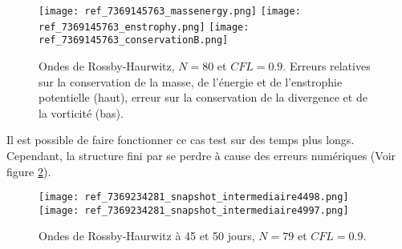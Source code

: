 \begin{figure}[htbp]
\begin{center}
\texttt{[image: ref\_7369145763\_massenergy.png]}
\texttt{[image: ref\_7369145763\_enstrophy.png]}
\texttt{[image: ref\_7369145763\_conservationB.png]}
\end{center}
\caption{Ondes de Rossby-Haurwitz, $N=80$ et $CFL=0.9$. Erreurs relatives sur la conservation de la masse, de l'énergie et de l'enstrophie potentielle (haut), erreur sur la conservation de la divergence et de la vorticité (bas).}
\label{fig: rossby conservation}
\end{figure}

Il est possible de faire fonctionner ce cas test sur des temps plus longs. Cependant, la structure fini par se perdre à cause des erreurs numériques (Voir figure \ref{fig: rossby 4550}).

\begin{figure}[htbp]
\begin{center}
\texttt{[image: ref\_7369234281\_snapshot\_intermediaire4498.png]}
\texttt{[image: ref\_7369234281\_snapshot\_intermediaire4997.png]}
\end{center}
\caption{Ondes de Rossby-Haurwitz à 45 et 50 jours, $N=79$ et $CFL=0.9$.}
\label{fig: rossby 4550}
\end{figure}